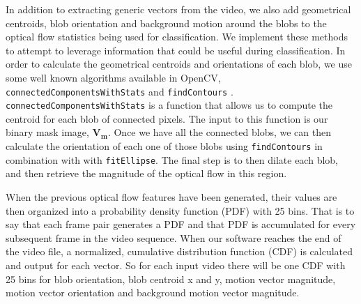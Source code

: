 In addition to extracting generic vectors from the video, we also add
geometrical centroids, blob orientation and background motion around the blobs
to the optical flow statistics being used for classification. We implement these
methods to attempt to leverage information that could be useful during
classification. In order to calculate the geometrical centroids and orientations
of each blob, we use some well known algorithms available in OpenCV,
\texttt{connectedComponentsWithStats} and \texttt{findContours}
\cite{itseez2015opencv}. \texttt{connectedComponentsWithStats} is a function
that allows us to compute the centroid for each blob of connected pixels. The
input to this function is our binary mask image, $\mathbf{V_m}$. Once we have
all the connected blobs, we can then calculate the orientation of each one of
those blobs using \texttt{findContours} in combination with with
\texttt{fitEllipse}. The final step is to then dilate each blob, and
then retrieve the magnitude of the optical flow in this region.


When the previous optical flow features have been generated, their values are
then organized into a probability density function (PDF) with 25 bins. That is
to say that each frame pair generates a PDF and that PDF is accumulated for
every subsequent frame in the video sequence. When our software reaches the end
of the video file, a normalized, cumulative distribution function (CDF) is
calculated and output for each vector. So for each input video there will be one
CDF with 25 bins for blob orientation, blob centroid x and y, motion vector
magnitude, motion vector orientation and background motion vector magnitude.
%

